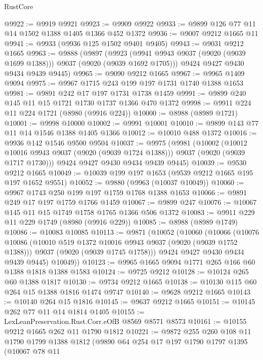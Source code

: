 \begin{lexlean}{RustCore}
\begin{coremodule}
@9922 := @9919 @9921
@9923 := @9909 @9922
@9933 := @9899 @126 @77 @11 @14 @1502 @1388 @1405 @1366 @452 @1372
@9936 := @9007 @9212 @1665 @11
@9941 := @9933 (@9936 @125 @1502 @9401 @9405)
@9943 := @9031 @9212 @1665
@9963 := @9888
    (@9897
      (@9923 (@9941 @9943 @9037 (@9020 (@9039 @1699 @1388))) @9037 (@9020 (@9039 @1692 @1705)))
      @9424
      @9427
      @9430
      @9434
      @9439
      @9445)
@9965 := @9090 @9212 @1665
@9967 := @9965 @1409 @9094
@9975 := @9967 @1715 @243 @199 @197 @1731 @1740 @1388 @1653
@9981 := @9891 @242 @17 @197 @1731 @1738 @1459
@9991 := @9899 @240 @145 @11 @15 @1721 @1730 @1737 @1366 @470 @1372
@9998 := @9911 @224 @11 @224 @1721 (@8980 (@9916 @224))
@10000 := @8988 (@8989 @1721)
@10001 := @9998 @10000
@10002 := @9991 @10001
@10010 := @9899 @143 @77 @11 @14 @1546 @1388 @1405 @1366
@10012 := @10010 @488 @1372
@10016 := @9936 @142 @1546 @9500 @9504
@10037 := @9975
    (@9981
      (@10002
        (@10012 @10016 @9943 @9037 (@9020 (@9039 @1724 @1388)))
        @9037
        (@9020 (@9039 @1717 @1730)))
      @9424
      @9427
      @9430
      @9434
      @9439
      @9445)
@10039 := @9530 @9212 @1665
@10049 := @10039 @199 @197 @1653 (@9539 @9212 @1665 @195 @197 @1652 @9551)
@10052 := @9880 (@9963 (@10037 @10049))
@10060 := @9967 @1743 @250 @199 @197 @1759 @1768 @1388 @1653
@10066 := @9891 @249 @17 @197 @1759 @1766 @1459
@10067 := @9899 @247
@10076 := @10067 @145 @11 @15 @1749 @1758 @1765 @1366 @506 @1372
@10083 := @9911 @229 @11 @229 @1749 (@8980 (@9916 @229))
@10085 := @8988 (@8989 @1749)
@10086 := @10083 @10085
@10113 := @9871
    (@10052
      (@10060
        (@10066
          (@10076
            @10086
            (@10010 @519 @1372 @10016 @9943 @9037 (@9020 (@9039 @1752 @1388)))
            @9037
            (@9020 (@9039 @1745 @1758)))
          @9424
          @9427
          @9430
          @9434
          @9439
          @9445)
        @10049))
@10123 := @9965 @1665 @9094 @1771 @265 @166 @60 @1388 @1818 @1388 @1583
@10124 := @9725 @9212
@10128 := @10124 @265 @60 @1388 @1817
@10130 := @9734 @9212 @1665
@10138 := @10130 @115 @60 @264 @15 @1388 @1816 @1474 @9747
@10140 := @9628 @9212 @1665
@10143 := @10140 @264 @15 @1816
@10145 := @9637 @9212 @1665
@10151 := @10145 @262 @77 @11 @14 @1814 @1405
@10155 := LexLeanPreservation.Rust.Corr.eOfB @8569 @8571 @8573
@10161 := @10155 @9212 @1665 @262 @11 @1790 @1812
@10221 := @9872
    @255
    @260
    @108
    @11
    @1790
    @1799
    @1388
    @1812
    (@9890
      @64
      @254
      @17
      @197
      @1790
      @1797
      @1395
      (@10067
        @78
        @11

\end{coremodule}
\end{lexlean}
